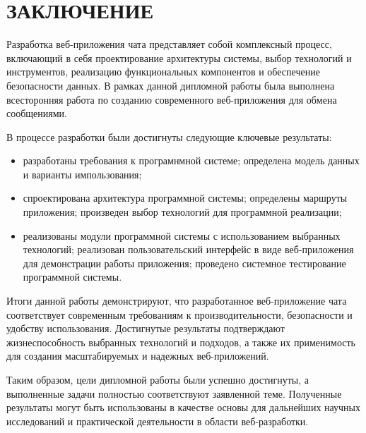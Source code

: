 \section*{ЗАКЛЮЧЕНИЕ}
Разработка веб-приложения чата представляет собой комплексный процесс, включающий в себя проектирование архитектуры системы, выбор технологий и инструментов, реализацию функциональных компонентов и обеспечение безопасности данных. В рамках данной дипломной работы была выполнена всесторонняя работа по созданию современного веб-приложения для обмена сообщениями.

В процессе разработки были достигнуты следующие ключевые результаты:

\begin{itemize}
	\item разработаны требования к програмнмной системе; определена модель данных и варианты импользования;
	
	\item спроектирована архитектура программной системы; определены маршруты приложения; произведен выбор технологий для программной реализации;
	
	\item реализованы модули программной системы с использованием выбранных технологий; реализован пользовательский интерфейс в виде веб-приложения для демонстрации работы приложения; проведено системное тестирование программной системы.
\end{itemize}

Итоги данной работы демонстрируют, что разработанное веб-приложение чата соответствует современным требованиям к производительности, безопасности и удобству использования. Достигнутые результаты подтверждают жизнеспособность выбранных технологий и подходов, а также их применимость для создания масштабируемых и надежных веб-приложений.

Таким образом, цели дипломной работы были успешно достигнуты, а выполненные задачи полностью соответствуют заявленной теме. Полученные результаты могут быть использованы в качестве основы для дальнейших научных исследований и практической деятельности в области веб-разработки.
